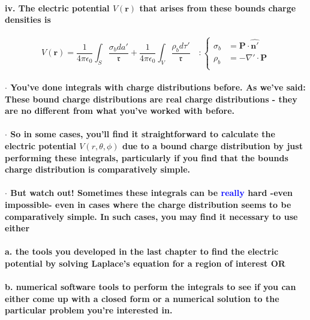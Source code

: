 \documentclass{article}
\begin{document}
\paragraph{\indent \indent iv. The electric potential $V(\boldsymbol{r})$ that arises from these bounds charge densities is}
\begin{equation*}
    V(\boldsymbol{r})=\frac{1}{4\pi\epsilon_0}\int_S \frac{\sigma_b da'}{\mathfrak{r}}+\frac{1}{4\pi\epsilon_0}\int_V \frac{\rho_b d\tau'}{\mathfrak{r}}\quad:\begin{cases}
        \sigma_b & =\boldsymbol{P}\cdot \hat{\boldsymbol{n'}}\\
        \rho_b & =-\nabla'\cdot\boldsymbol{P}\\
    \end{cases}
\end{equation*}
\paragraph{\indent\indent $\cdot$ You've done integrals with charge distributions before. As we've said: These bound charge distributions are real charge distributions - they are no different from what you've worked with before.}
\paragraph{\indent\indent $\cdot$ So in some cases, you'll find it straightforward to calculate the electric potential $V(r,\theta,\phi)$ due to a bound charge distribution by just performing these integrals, particularly if you find that the bounds charge distribution is comparatively simple.}
\paragraph{\indent \indent $\cdot$ But watch out! Sometimes these integrals can be \textcolor{blue}{really} hard -even impossible- even in cases where the charge distribution seems to be comparatively simple. In such cases, you may find it necessary to use either}
\paragraph{\indent\indent \indent a. the tools you developed in the last chapter to find the electric potential by solving Laplace's equation for a region of interest OR}
\paragraph{\indent\indent \indent b. numerical software tools to perform the integrals to see if you can either come up with a closed form or a numerical solution to the particular problem you're interested in.}
\end{document}
